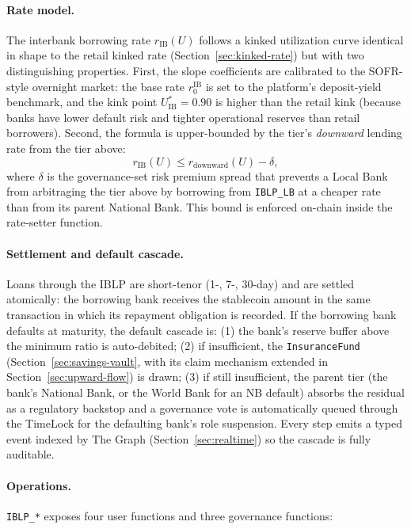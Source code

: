 \documentclass[12pt,a4paper]{report}
\begin{document}
\paragraph{Rate model.}
The interbank borrowing rate $r_{\text{IB}}(U)$ follows a kinked utilization curve identical in shape to the retail kinked rate (Section~\ref{sec:kinked-rate}) but with two distinguishing properties. First, the slope coefficients are calibrated to the SOFR-style overnight market: the base rate $r_0^{\text{IB}}$ is set to the platform's deposit-yield benchmark, and the kink point $U^{*}_{\text{IB}} = 0.90$ is higher than the retail kink (because banks have lower default risk and tighter operational reserves than retail borrowers). Second, the formula is upper-bounded by the tier's \emph{downward} lending rate from the tier above:
\[
r_{\text{IB}}(U) \le r_{\text{downward}}(U) - \delta,
\]
where $\delta$ is the governance-set risk premium spread that prevents a Local Bank from arbitraging the tier above by borrowing from \texttt{IBLP\_LB} at a cheaper rate than from its parent National Bank. This bound is enforced on-chain inside the rate-setter function.

\paragraph{Settlement and default cascade.}
Loans through the IBLP are short-tenor (1-, 7-, 30-day) and are settled atomically: the borrowing bank receives the stablecoin amount in the same transaction in which its repayment obligation is recorded. If the borrowing bank defaults at maturity, the default cascade is: (1) the bank's reserve buffer above the minimum ratio is auto-debited; (2) if insufficient, the \texttt{InsuranceFund} (Section~\ref{sec:savings-vault}, with its claim mechanism extended in Section~\ref{sec:upward-flow}) is drawn; (3) if still insufficient, the parent tier (the bank's National Bank, or the World Bank for an NB default) absorbs the residual as a regulatory backstop and a governance vote is automatically queued through the TimeLock for the defaulting bank's role suspension. Every step emits a typed event indexed by The Graph (Section~\ref{sec:realtime}) so the cascade is fully auditable.

\paragraph{Operations.}
\texttt{IBLP\_*} exposes four user functions and three governance functions:
\end{document}

